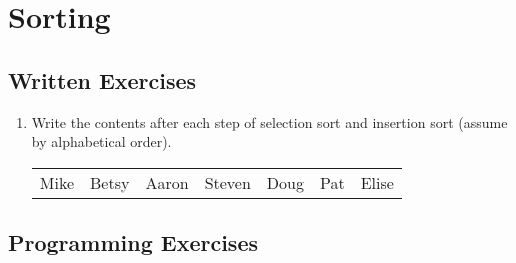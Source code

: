 \section{Sorting}

\subsection{Written Exercises}

\setcounter{counter}{1}
\begin{enumerate}[label={\arabic{counter}\addtocounter{counter}{1}}.]

\item Write the contents after each step of selection sort and insertion sort (assume by alphabetical order).
\begin{table}[h]
\begin{tabular}{lllllll}
Mike & Betsy & Aaron & Steven & Doug & Pat & Elise
\end{tabular}
\end{table}

\end{enumerate}

\subsection{Programming Exercises}